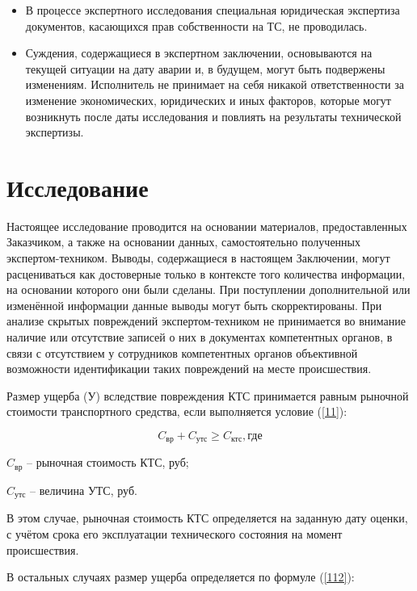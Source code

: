 \begin{itemize}
\item  {В процессе экспертного исследования специальная юридическая экспертиза документов, касающихся прав собственности на ТС, не проводилась.}
\item  {Суждения, содержащиеся в экспертном заключении, основываются на текущей ситуации на дату аварии и, в будущем, могут быть подвержены изменениям.
Исполнитель не принимает на себя никакой ответственности за изменение экономических, юридических и иных факторов, которые могут возникнуть после даты исследования и повлиять на результаты технической экспертизы.
}\end{itemize}
%
%
\section{Исследование}
%
Настоящее исследование проводится на основании материалов, предоставленных Заказчиком, а также на основании данных, самостоятельно полученных экспертом-техником. Выводы, содержащиеся в настоящем Заключении, могут расцениваться как достоверные только в контексте того количества информации, на основании которого они были сделаны. При поступлении дополнительной или изменённой информации данные выводы могут быть
скорректированы. При анализе скрытых повреждений экспертом-техником не принимается во внимание наличие или отсутствие записей о них в документах компетентных органов, в связи с отсутствием у сотрудников компетентных органов объективной возможности  идентификации таких повреждений на месте происшествия.

\par Размер ущерба (У) вследствие повреждения КТС принимается равным рыночной стоимости транспортного средства, если выполняется условие (\ref{11}):

\begin{equation}\label{11}
C_\text{вр} + C_\text{утс} \geq  C_\text{ктс},    \text{где}
\end{equation}

$ C_\text{вр}  $ -- рыночная стоимость КТС, руб;

$ C_\text{утс} $ --  величина УТС, руб.

В этом случае, рыночная стоимость КТС определяется на заданную дату оценки, с учётом срока его эксплуатации технического состояния на момент происшествия.

В остальных случаях размер ущерба определяется по формуле (\ref{112}):

